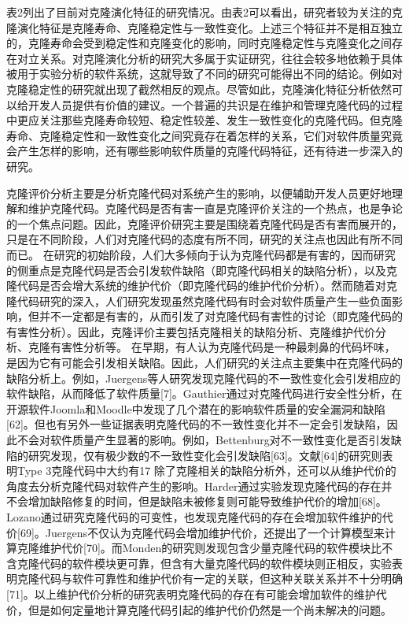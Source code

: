 表2列出了目前对克隆演化特征的研究情况。由表2可以看出，研究者较为关注的克隆演化特征是克隆寿命、克隆稳定性与一致性变化。上述三个特征并不是相互独立的，克隆寿命会受到稳定性和克隆变化的影响，同时克隆稳定性与克隆变化之间存在对立关系。对克隆演化分析的研究大多属于实证研究，往往会较多地依赖于具体被用于实验分析的软件系统，这就导致了不同的研究可能得出不同的结论。例如对克隆稳定性的研究就出现了截然相反的观点。尽管如此，克隆演化特征分析依然可以给开发人员提供有价值的建议。一个普遍的共识是在维护和管理克隆代码的过程中更应关注那些克隆寿命较短、稳定性较差、发生一致性变化的克隆代码。但克隆寿命、克隆稳定性和一致性变化之间究竟存在着怎样的关系，它们对软件质量究竟会产生怎样的影响，还有哪些影响软件质量的克隆代码特征，还有待进一步深入的研究。



克隆评价分析主要是分析克隆代码对系统产生的影响，以便辅助开发人员更好地理解和维护克隆代码。克隆代码是否有害一直是克隆评价关注的一个热点，也是争论的一个焦点问题。因此，克隆评价研究主要是围绕着克隆代码是否有害而展开的，只是在不同阶段，人们对克隆代码的态度有所不同，研究的关注点也因此有所不同而已。
在研究的初始阶段，人们大多倾向于认为克隆代码都是有害的，因而研究的侧重点是克隆代码是否会引发软件缺陷（即克隆代码相关的缺陷分析），以及克隆代码是否会增大系统的维护代价（即克隆代码的维护代价分析）。然而随着对克隆代码研究的深入，人们研究发现虽然克隆代码有时会对软件质量产生一些负面影响，但并不一定都是有害的，从而引发了对克隆代码有害性的讨论（即克隆代码的有害性分析）。因此，克隆评价主要包括克隆相关的缺陷分析、克隆维护代价分析、克隆有害性分析等。
在早期，有人认为克隆代码是一种最刺鼻的代码坏味，是因为它有可能会引发相关缺陷。因此，人们研究的关注点主要集中在克隆代码的缺陷分析上。例如，Juergens等人研究发现克隆代码的不一致性变化会引发相应的软件缺陷，从而降低了软件质量[7]。Gauthier通过对克隆代码进行安全性分析，在开源软件Joomla和Moodle中发现了几个潜在的影响软件质量的安全漏洞和缺陷[62]。但也有另外一些证据表明克隆代码的不一致性变化并不一定会引发缺陷，因此不会对软件质量产生显著的影响。例如，Bettenburg对不一致性变化是否引发缺陷的研究发现，仅有极少数的不一致性变化会引发缺陷[63]。文献[64]的研究则表明Type 3克隆代码中大约有17%
除了克隆相关的缺陷分析外，还可以从维护代价的角度去分析克隆代码对软件产生的影响。Harder通过实验发现克隆代码的存在并不会增加缺陷修复的时间，但是缺陷未被修复则可能导致维护代价的增加[68]。Lozano通过研究克隆代码的可变性，也发现克隆代码的存在会增加软件维护的代价[69]。Juergens不仅认为克隆代码会增加维护代价，还提出了一个计算模型来计算克隆维护代价[70]。而Monden的研究则发现包含少量克隆代码的软件模块比不含克隆代码的软件模块更可靠，但含有大量克隆代码的软件模块则正相反，实验表明克隆代码与软件可靠性和维护代价有一定的关联，但这种关联关系并不十分明确[71]。以上维护代价分析的研究表明克隆代码的存在有可能会增加软件的维护代价，但是如何定量地计算克隆代码引起的维护代价仍然是一个尚未解决的问题。

